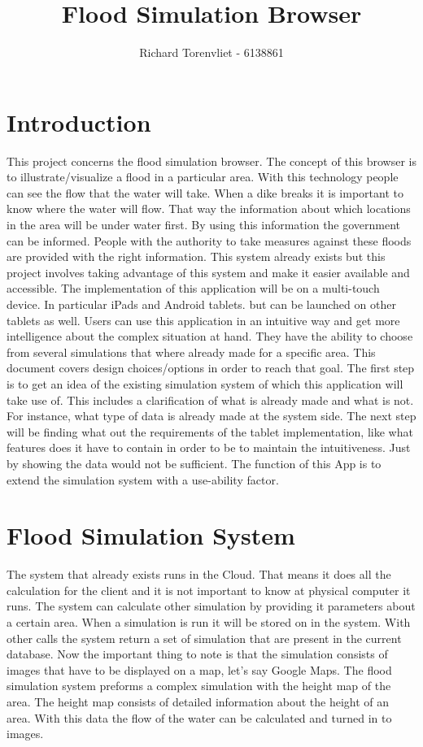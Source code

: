 \documentclass[10pt,a4paper]{article}
\author{Richard Torenvliet - 6138861}
\title{Flood Simulation Browser}
\begin{document}
\maketitle
\section{Introduction}
This project concerns the flood simulation browser. The concept of this browser is to illustrate/visualize a flood in a particular area. With this technology people can see the flow that the water will take. When a dike breaks it is important to know where the water will flow. That way the information about which locations in the area will be under water first. By using this information the government can be informed. People with the authority to take measures against these floods are provided with the right information. This system already exists but this project involves taking advantage of this system and make it easier available and accessible.
The implementation of this application will be on a multi-touch device. In particular iPads and Android tablets. but can be launched on other tablets as well. Users can use this application in an intuitive way and get more intelligence about the complex situation at hand. They have the ability to choose from several simulations that where already made for a specific area.
This document covers design choices/options in order to reach that goal. The first step is to get an idea of the existing simulation system of which this application will take use of. This includes a clarification of what is already made and what is not. For instance, what type of data is already made at the system side. The next step will be finding what out the requirements of the tablet implementation, like what features does it have to contain in order to be to maintain the intuitiveness. Just by showing the data would not be sufficient. The function of this App is to extend the simulation system with a use-ability factor.

\section{Flood Simulation System}
The system that already exists runs in the Cloud. That means it does all the calculation for the client and it is not important to know at physical computer it runs. The system can calculate other simulation by providing it parameters about a certain area. When a simulation is run it will be stored on in the system. With other calls the system return a set of simulation that are present in the current database. Now the important thing to note is that the simulation consists of images that have to be displayed on a map, let's say Google Maps. The flood simulation system preforms a complex simulation with the height map of the area. The height map consists of detailed information about the height of an area. With this data the flow of the water can be calculated and turned in to images.
 
\end{document}
